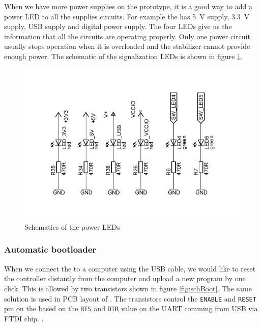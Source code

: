 When we have more power supplies on the prototype, it is a good way to add a power \ac{LED} to all the supplies circuits. For example the  has \SI{5}{V} supply, \SI{3.3}{V} supply, USB supply and digital power supply. The four \ac{LED}s give us the information that all the circuits are operating properly. Only one power circuit usually stops operation when it is overloaded and the stabilizer cannot provide enough power. The schematic of the signalization \ac{LED}s is shown in figure \ref{fig:schLeds}.

\begin{figure}
    \centering
    \caption{Schematics of the power LEDs}
    \label{fig:schLeds}
    \includegraphics[scale=1.3]{img/SchLeds.pdf}
    \vspace{-0.5cm}
\end{figure}

\subsubsection{Automatic bootloader}

When we connect the  to a computer using the \ac{USB} cable, we would like to reset the  controller distantly from the computer and upload a new program by one click. This is allowed by two transistors shown in figure \ref{fig:schBoot}. The same solution is used in \ac{PCB} layout of . \cite{espressif:ESP32DevKitC} The transistors control the \texttt{ENABLE} and \texttt{RESET} pin on the  based on the \texttt{RTS} and \texttt{DTR} value on the \ac{UART} comming from \ac{USB} via FTDI chip. \cite{ftdichip:FT232R}.

